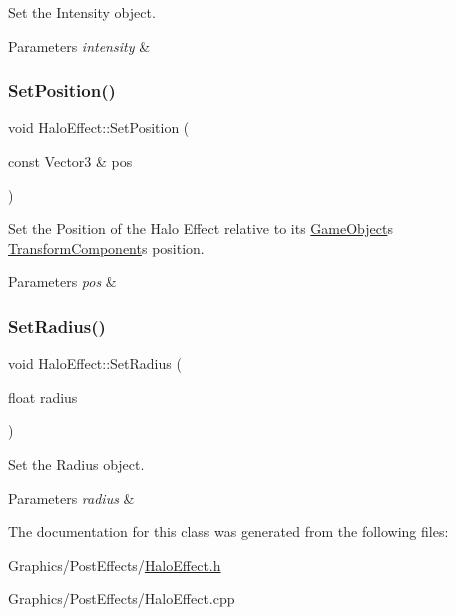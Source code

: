 Set the Intensity object. 


\begin{DoxyParams}{Parameters}
{\em intensity} & \\
\hline
\end{DoxyParams}
\mbox{\label{classHaloEffect_ac18176eaf288934834aa0af6c80b0b53}} 
\subsubsection{\texorpdfstring{Set\+Position()}{SetPosition()}}
{\footnotesize\ttfamily void Halo\+Effect\+::\+Set\+Position (\begin{DoxyParamCaption}\item[{const Vector3 \&}]{pos }\end{DoxyParamCaption})\hspace{0.3cm}{\ttfamily [inline]}}



Set the Position of the Halo Effect relative to its \hyperlink{classGameObject}{Game\+Object}\textquotesingle{}s \hyperlink{classTransformComponent}{Transform\+Component}\textquotesingle{}s position. 


\begin{DoxyParams}{Parameters}
{\em pos} & \\
\hline
\end{DoxyParams}
\mbox{\label{classHaloEffect_abee34a573ebce91df24cb8780730d5bf}} 
\subsubsection{\texorpdfstring{Set\+Radius()}{SetRadius()}}
{\footnotesize\ttfamily void Halo\+Effect\+::\+Set\+Radius (\begin{DoxyParamCaption}\item[{float}]{radius }\end{DoxyParamCaption})}



Set the Radius object. 


\begin{DoxyParams}{Parameters}
{\em radius} & \\
\hline
\end{DoxyParams}


The documentation for this class was generated from the following files\+:\begin{DoxyCompactItemize}
\item 
Graphics/\+Post\+Effects/\hyperlink{HaloEffect_8h}{Halo\+Effect.\+h}\item 
Graphics/\+Post\+Effects/Halo\+Effect.\+cpp\end{DoxyCompactItemize}
